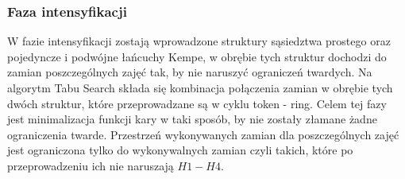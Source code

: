 \subsubsection{Faza intensyfikacji}
\par W fazie intensyfikacji zostają wprowadzone struktury sąsiedztwa prostego oraz pojedyncze i podwójne łańcuchy Kempe, w obrębie tych struktur dochodzi do zamian poszczególnych zajęć tak, by nie naruszyć ograniczeń twardych. Na algorytm Tabu Search składa się kombinacja połączenia zamian w obrębie tych dwóch struktur, które przeprowadzane są w cyklu token - ring. Celem tej fazy jest minimalizacja funkcji kary w taki sposób, by nie zostały złamane żadne ograniczenia twarde. Przestrzeń wykonywanych zamian dla poszczególnych zajęć jest ograniczona tylko do wykonywalnych zamian czyli takich, które po przeprowadzeniu ich nie naruszają ${H1-H4}$.
